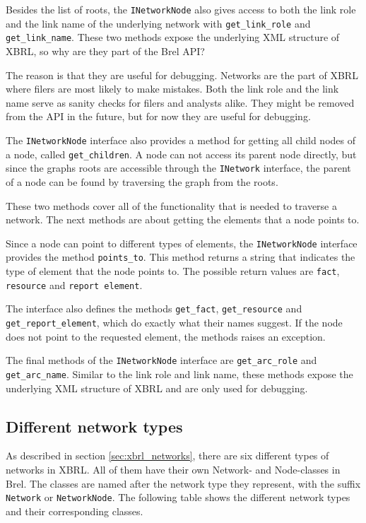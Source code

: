 Besides the list of roots, the \texttt{INetworkNode} also gives access to both the link role and the link name 
of the underlying network with \texttt{get\_link\_role} and \texttt{get\_link\_name}.
These two methods expose the underlying XML structure of XBRL, so why are they part of the Brel API?

The reason is that they are useful for debugging.
Networks are the part of XBRL where filers are most likely to make mistakes.
Both the link role and the link name serve as sanity checks for filers and analysts alike.
They might be removed from the API in the future, but for now they are useful for debugging.

The \texttt{INetworkNode} interface also provides a method for getting all child nodes of a node, called \texttt{get\_children}.
A node can not access its parent node directly, but since the graphs roots are accessible through the \texttt{INetwork} interface,
the parent of a node can be found by traversing the graph from the roots.

These two methods cover all of the functionality that is needed to traverse a network.
The next methods are about getting the elements that a node points to.

Since a node can point to different types of elements, the \texttt{INetworkNode} interface provides the method \texttt{points\_to}.
This method returns a string that indicates the type of element that the node points to.
The possible return values are \texttt{fact}, \texttt{resource} and \texttt{report element}.

The interface also defines the methods \texttt{get\_fact}, \texttt{get\_resource} and \texttt{get\_report\_element}, 
which do exactly what their names suggest.
If the node does not point to the requested element, the methods raises an exception.

The final methods of the \texttt{INetworkNode} interface are \texttt{get\_arc\_role} and \texttt{get\_arc\_name}.
Similar to the link role and link name, these methods expose the underlying XML structure of XBRL and are only used for debugging.

\subsection{Different network types}

As described in section \ref{sec:xbrl_networks}, there are six different types of networks in XBRL.
All of them have their own Network- and Node-classes in Brel.
The classes are named after the network type they represent, with the suffix \texttt{Network} or \texttt{NetworkNode}.
The following table shows the different network types and their corresponding classes.

